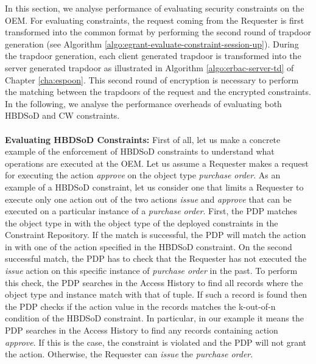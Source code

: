 \documentclass[epsfig,a4paper,11pt,titlepage]{book}
\numberwithin{algorithm}{chapter}
\begin{document}
In this section, we analyse performance of evaluating security constraints on the \gls{OEM}. For evaluating constraints, the request coming from the Requester is first transformed into the common format by performing the second round of trapdoor generation (see Algorithm \ref{algo:egrant-evaluate-constraint-session-up}). During the trapdoor generation, each client generated trapdoor is transformed into the server generated trapdoor as illustrated in Algorithm \ref{algo:erbac-server-td} of Chapter \ref{cha:espoon}. This second round of encryption is necessary to perform the matching between the trapdoors of the request and the encrypted constraints. In the following, we analyse the performance overheads of evaluating both \gls{HBDSoD} and \gls{CW} constraints. \\ \\
\noindent \textbf{Evaluating \gls{HBDSoD} Constraints:} First of all, let us make a concrete example of the enforcement of \gls{HBDSoD} constraints to understand what operations are executed at the \gls{OEM}. Let us assume a Requester makes a request  for executing the action \emph{approve} on the object type \emph{purchase order}. As an example of a \gls{HBDSoD} constraint, let us consider one that limits a Requester to execute only one action out of the two actions \emph{issue} and \emph{approve} that can be executed on a particular instance of a \emph{purchase order}. First, the \gls{PDP} matches the object type in  with the object type of the deployed constraints in the Constraint Repository. If the match is successful, the \gls{PDP} will match the action in  with one of the action specified in the \gls{HBDSoD} constraint. On the second successful match, the \gls{PDP} has to check that the Requester has not executed the \emph{issue} action on this specific instance of \emph{purchase order} in the past. To perform this check, the \gls{PDP} searches in the Access History to find all records where the object type and instance match with that of  tuple. If such a record is found then the \gls{PDP} checks if the action value in the records matches the k-out-of-n condition of the \gls{HBDSoD} constraint. In particular, in our example it means the \gls{PDP} searches in the Access History to find any records containing action \emph{approve}. If this is the case, the constraint is violated and the \gls{PDP} will not grant the action. Otherwise, the Requester can \emph{issue} the \emph{purchase order}.
\end{document}

